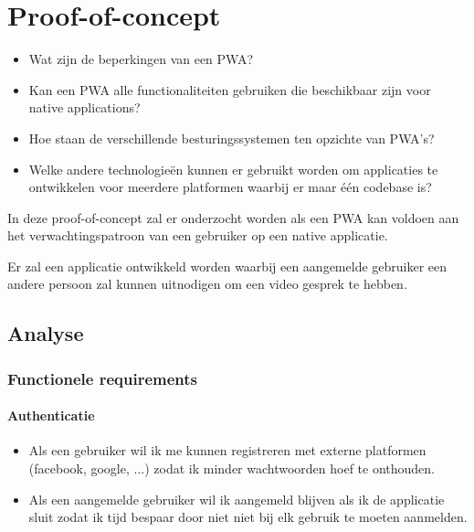 \chapter{Proof-of-concept}
\label{ch:Proof-of-concept}

	\begin{itemize}
		  \item Wat zijn de beperkingen van een PWA?
		  \item Kan een PWA alle functionaliteiten gebruiken die beschikbaar zijn voor native applications?
		  \item Hoe staan de verschillende besturingssystemen ten opzichte van PWA's?
		  \item Welke andere technologieën kunnen er gebruikt worden om applicaties te ontwikkelen voor meerdere platformen waarbij er maar één codebase is?
	  \end{itemize}	

In deze proof-of-concept zal er onderzocht worden als een PWA kan voldoen aan het verwachtingspatroon van een gebruiker op een native applicatie.

Er zal een applicatie ontwikkeld worden waarbij een aangemelde gebruiker een  andere persoon zal kunnen uitnodigen om een video gesprek te hebben. 

 \section{Analyse}
	 \subsection{Functionele requirements}
	 	\subsubsection{Authenticatie}
		 	\begin{itemize}
			 	\item Als een gebruiker wil ik me kunnen registreren met externe platformen (facebook, google, ...) zodat ik minder wachtwoorden hoef te onthouden.
			 	\item Als een aangemelde gebruiker wil ik aangemeld blijven als ik de applicatie sluit zodat ik tijd bespaar door niet niet bij elk gebruik te moeten aanmelden.
		 	\end{itemize}
		 	
